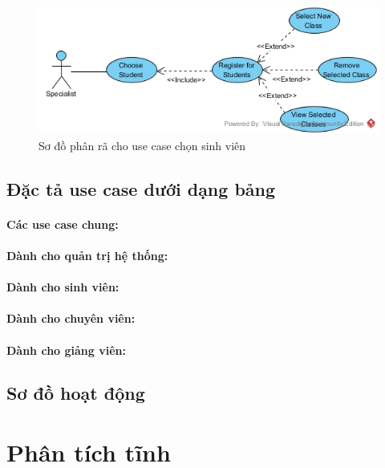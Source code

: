 \documentclass{article}
\begin{document}
  \begin{figure}[!htb]
    \centering
    \includegraphics[scale=0.5]{../pictures/projectdiagrams/Choose-Student-uc-destructing.jpg}
    \caption{Sơ đồ phân rã cho use case chọn sinh viên}
  \end{figure}

  \clearpage %
  \subsection{Đặc tả use case dưới dạng bảng}

  \paragraph{Các use case chung:}

  \paragraph{Dành cho quản trị hệ thống:}

  \paragraph{Dành cho sinh viên:}

  \paragraph{Dành cho chuyên viên:}

  \paragraph{Dành cho giảng viên:}

  \subsection{Sơ đồ hoạt động}

\section{Phân tích tĩnh}
\end{document}
